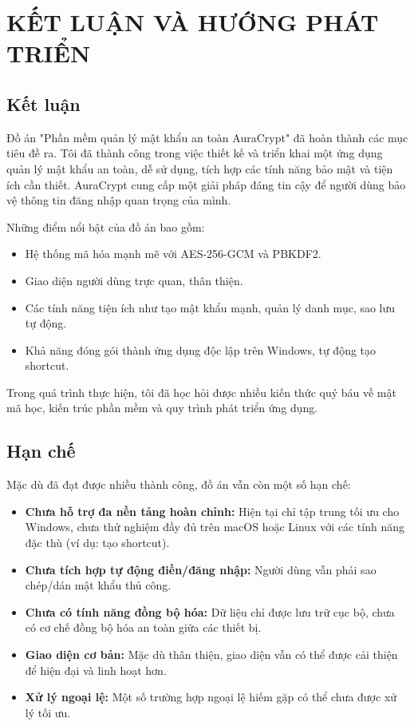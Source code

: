 \chapter{KẾT LUẬN VÀ HƯỚNG PHÁT TRIỂN}

\section{Kết luận}
Đồ án "Phần mềm quản lý mật khẩu an toàn AuraCrypt" đã hoàn thành các mục tiêu đề ra. Tôi đã thành công trong việc thiết kế và triển khai một ứng dụng quản lý mật khẩu an toàn, dễ sử dụng, tích hợp các tính năng bảo mật và tiện ích cần thiết. AuraCrypt cung cấp một giải pháp đáng tin cậy để người dùng bảo vệ thông tin đăng nhập quan trọng của mình.

Những điểm nổi bật của đồ án bao gồm:
\begin{itemize}
    \item Hệ thống mã hóa mạnh mẽ với AES-256-GCM và PBKDF2.
    \item Giao diện người dùng trực quan, thân thiện.
    \item Các tính năng tiện ích như tạo mật khẩu mạnh, quản lý danh mục, sao lưu tự động.
    \item Khả năng đóng gói thành ứng dụng độc lập trên Windows, tự động tạo shortcut.
\end{itemize}
Trong quá trình thực hiện, tôi đã học hỏi được nhiều kiến thức quý báu về mật mã học, kiến trúc phần mềm và quy trình phát triển ứng dụng.

\section{Hạn chế}
Mặc dù đã đạt được nhiều thành công, đồ án vẫn còn một số hạn chế:
\begin{itemize}
    \item \textbf{Chưa hỗ trợ đa nền tảng hoàn chỉnh:} Hiện tại chỉ tập trung tối ưu cho Windows, chưa thử nghiệm đầy đủ trên macOS hoặc Linux với các tính năng đặc thù (ví dụ: tạo shortcut).
    \item \textbf{Chưa tích hợp tự động điền/đăng nhập:} Người dùng vẫn phải sao chép/dán mật khẩu thủ công.
    \item \textbf{Chưa có tính năng đồng bộ hóa:} Dữ liệu chỉ được lưu trữ cục bộ, chưa có cơ chế đồng bộ hóa an toàn giữa các thiết bị.
    \item \textbf{Giao diện cơ bản:} Mặc dù thân thiện, giao diện vẫn có thể được cải thiện để hiện đại và linh hoạt hơn.
\item \textbf{Xử lý ngoại lệ:} Một số trường hợp ngoại lệ hiếm gặp có thể chưa được xử lý tối ưu.
\end{itemize}

